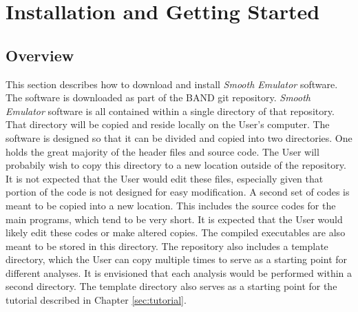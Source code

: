 \documentclass[UserManual.tex]{subfiles}
\begin{document}
\section{Installation and Getting Started}\label{sec:installation}

\subsection{Overview}
This section describes how to download and install {\it Smooth Emulator} software. The software is downloaded as part of the BAND git repository. {\it Smooth Emulator} software is all contained within a single directory of that repository. That directory will be copied and reside locally on the User's computer. The software is designed so that it can be divided and copied into two directories. One holds the great majority of the header files and source code. The User will probabily wish to copy this directory to a new location outside of the repository. It is not expected that the User would edit these files, especially given that portion of the code is not designed for easy modification. A second set of codes is meant to be copied into a new location. This includes the source codes for the main programs, which tend to be very short. It is expected that the User would likely edit these codes or make altered copies. The compiled executables are also meant to be stored in this directory. The repository also includes a template directory, which the User can copy multiple times to serve as a starting point for different analyses. It is envisioned that each analysis would be performed within a second directory. The template directory also serves as a starting point for the tutorial described in Chapter \ref{sec:tutorial}.
\end{document}
